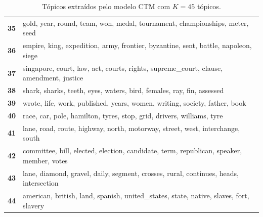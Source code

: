 \begin{table}[htpb]
\begin{tabularx}{\textwidth}{@{}l X@{}}
        \textbf{35} & gold, year, round, team, won, medal, tournament, championships, meter, seed \\
        \textbf{36} & empire, king, expedition, army, frontier, byzantine, sent, battle, napoleon, siege \\
        \textbf{37} & singapore, court, law, act, courts, rights, supreme\_court, clause, amendment, justice \\
        \textbf{38} & shark, sharks, teeth, eyes, waters, bird, females, ray, fin, assessed \\
        \textbf{39} & wrote, life, work, published, years, women, writing, society, father, book \\
        \textbf{40} & race, car, pole, hamilton, tyres, stop, grid, drivers, williams, tyre \\
        \textbf{41} & lane, road, route, highway, north, motorway, street, west, interchange, south \\
        \textbf{42} & committee, bill, elected, election, candidate, term, republican, speaker, member, votes \\
        \textbf{43} & lane, diamond, gravel, daily, segment, crosses, rural, continues, heads, intersection \\
        \textbf{44} & american, british, land, spanish, united\_states, state, native, slaves, fort, slavery \\
        \bottomrule
    \end{tabularx}
    \caption{Tópicos extraídos pelo modelo CTM com $K=45$ tópicos.}
    \label{tab:topicos_ctm_45}
\end{table}
